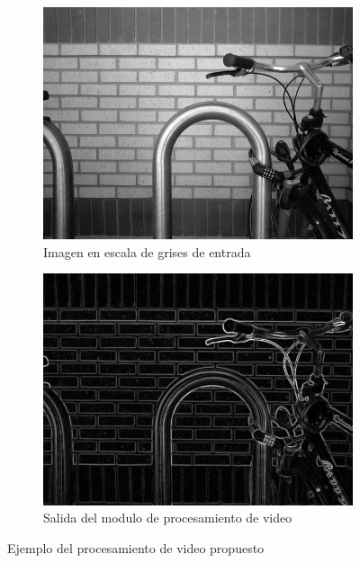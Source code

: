 \documentclass[10pt, letterpaper, conference]{IEEEtran}
\begin{document}
\begin{figure}[!h]
  \centering
  \begin{subfigure}{0.45\columnwidth}
    \centering
    \includegraphics[width=\columnwidth]{img/bike_gray.jpg}
    \caption{Imagen en escala de grises de entrada}
    \label{fig:bike_gray}
  \end{subfigure}
  \hfill
  \begin{subfigure}{0.45\columnwidth}
      \centering
      \includegraphics[width=\columnwidth]{img/bike_sobel.jpg}
      \caption{Salida del modulo de procesamiento de video}
      \label{fig:bike_sobel}
  \end{subfigure}
  \hfill
    \caption{Ejemplo del procesamiento de video propuesto}
    \label{fig:processing_unit_example}
\end{figure}
\end{document}

